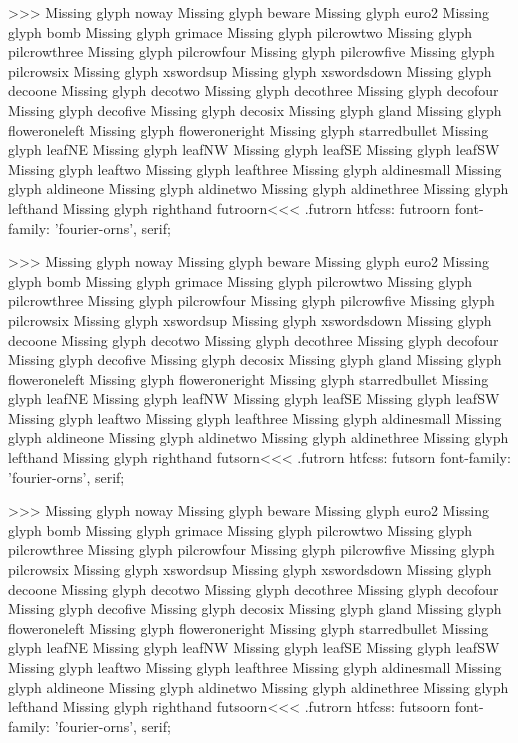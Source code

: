 {>>>
Missing glyph	noway
Missing glyph	beware
Missing glyph	euro2
Missing glyph	bomb
Missing glyph	grimace
Missing glyph	pilcrowtwo
Missing glyph	pilcrowthree
Missing glyph	pilcrowfour
Missing glyph	pilcrowfive
Missing glyph	pilcrowsix
Missing glyph	xswordsup
Missing glyph	xswordsdown
Missing glyph	decoone
Missing glyph	decotwo
Missing glyph	decothree
Missing glyph	decofour
Missing glyph	decofive
Missing glyph	decosix
Missing glyph	gland
Missing glyph	floweroneleft
Missing glyph	floweroneright
Missing glyph	starredbullet
Missing glyph	leafNE
Missing glyph	leafNW
Missing glyph	leafSE
Missing glyph	leafSW
Missing glyph	leaftwo
Missing glyph	leafthree
Missing glyph	aldinesmall
Missing glyph	aldineone
Missing glyph	aldinetwo
Missing glyph	aldinethree
Missing glyph	lefthand
Missing glyph	righthand
\<futroorn\><<<
.futrorn
htfcss:  futroorn  font-family: 'fourier-orns', serif;

>>>
Missing glyph	noway
Missing glyph	beware
Missing glyph	euro2
Missing glyph	bomb
Missing glyph	grimace
Missing glyph	pilcrowtwo
Missing glyph	pilcrowthree
Missing glyph	pilcrowfour
Missing glyph	pilcrowfive
Missing glyph	pilcrowsix
Missing glyph	xswordsup
Missing glyph	xswordsdown
Missing glyph	decoone
Missing glyph	decotwo
Missing glyph	decothree
Missing glyph	decofour
Missing glyph	decofive
Missing glyph	decosix
Missing glyph	gland
Missing glyph	floweroneleft
Missing glyph	floweroneright
Missing glyph	starredbullet
Missing glyph	leafNE
Missing glyph	leafNW
Missing glyph	leafSE
Missing glyph	leafSW
Missing glyph	leaftwo
Missing glyph	leafthree
Missing glyph	aldinesmall
Missing glyph	aldineone
Missing glyph	aldinetwo
Missing glyph	aldinethree
Missing glyph	lefthand
Missing glyph	righthand
\<futsorn\><<<
.futrorn
htfcss:  futsorn  font-family: 'fourier-orns', serif;

>>>
Missing glyph	noway
Missing glyph	beware
Missing glyph	euro2
Missing glyph	bomb
Missing glyph	grimace
Missing glyph	pilcrowtwo
Missing glyph	pilcrowthree
Missing glyph	pilcrowfour
Missing glyph	pilcrowfive
Missing glyph	pilcrowsix
Missing glyph	xswordsup
Missing glyph	xswordsdown
Missing glyph	decoone
Missing glyph	decotwo
Missing glyph	decothree
Missing glyph	decofour
Missing glyph	decofive
Missing glyph	decosix
Missing glyph	gland
Missing glyph	floweroneleft
Missing glyph	floweroneright
Missing glyph	starredbullet
Missing glyph	leafNE
Missing glyph	leafNW
Missing glyph	leafSE
Missing glyph	leafSW
Missing glyph	leaftwo
Missing glyph	leafthree
Missing glyph	aldinesmall
Missing glyph	aldineone
Missing glyph	aldinetwo
Missing glyph	aldinethree
Missing glyph	lefthand
Missing glyph	righthand
\<futsoorn\><<<
.futrorn
htfcss:  futsoorn  font-family: 'fourier-orns', serif;

}
